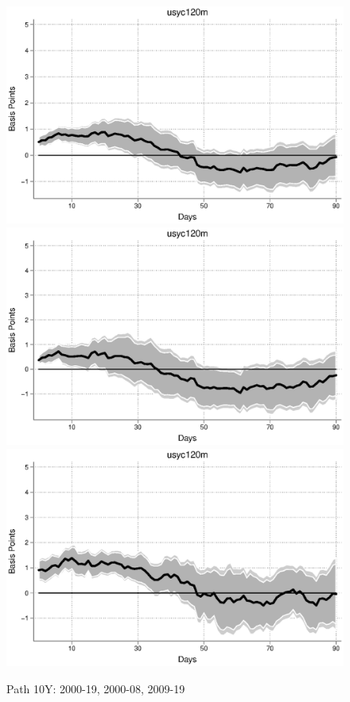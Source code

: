\documentclass{article}
\begin{document}
\begin{figure}[tbph]
	\begin{center}
		\caption{Path 10Y: 2000-19, 2000-08, 2009-19}
		\includegraphics[trim={0cm 0cm 0cm 0cm},clip,height=0.3\textheight,width=1\textwidth]{../LagDep-FX/Path/US/usyc120m00-19path.eps} \\
		\includegraphics[trim={0cm 0cm 0cm 0cm},clip,height=0.3\textheight,width=1\textwidth]{../LagDep-FX/Path/US/usyc120m00-08path.eps} \\
		\includegraphics[trim={0cm 0cm 0cm 0cm},clip,height=0.3\textheight,width=1\textwidth]{../LagDep-FX/Path/US/usyc120m09-19path.eps} \\

\end{center}
\end{figure}
\end{document}
